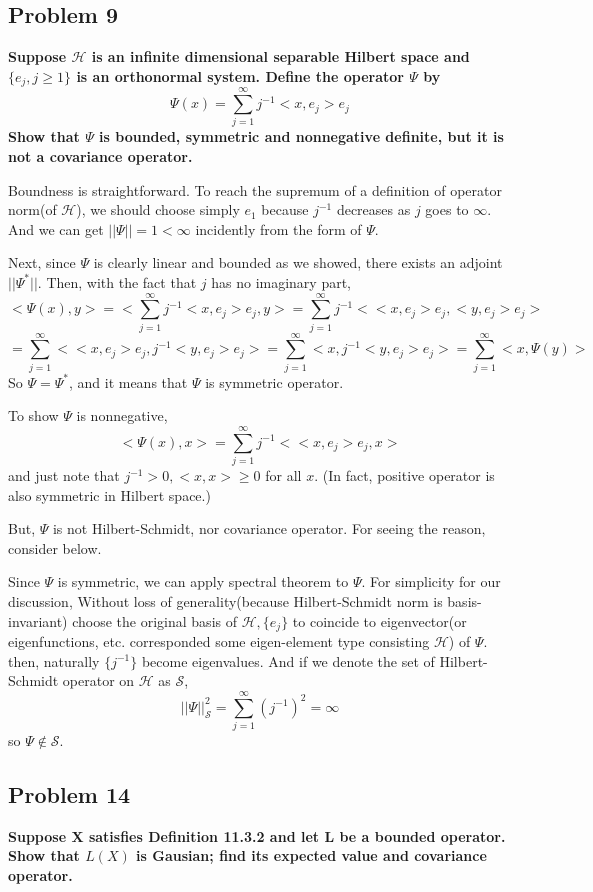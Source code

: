 \documentclass{article}
\begin{document}
\newpage
\subsection{Problem 9}
\textbf{
    Suppose $\mathcal{H}$ is an infinite dimensional separable Hilbert space and $\{e_j,j\geq1\}$ is an orthonormal system.
    Define the operator $\Psi$ by
    \[\Psi(x)=\sum_{j=1}^{\infty}j^{-1}<x,e_j>e_j\]
    Show that $\Psi$ is bounded, symmetric and nonnegative definite, but it is not a covariance operator.
}

Boundness is straightforward. To reach the supremum of a definition of operator norm(of $\mathcal{H}$),
we should choose simply $e_1$ because $j^{-1}$ decreases as $j$ goes to $\infty$.
And we can get $||\Psi||=1<\infty$ incidently from the form of $\Psi$.

Next, since $\Psi$ is clearly linear and bounded as we showed, there exists an adjoint $||\Psi^*||$.
Then, with the fact that $j$ has no imaginary part,
\[<\Psi(x),y>=<\sum_{j=1}^{\infty}j^{-1}<x,e_j>e_j,y>
=\sum_{j=1}^{\infty}j^{-1}<<x,e_j>e_j,<y,e_j>e_j>\]
\[=\sum_{j=1}^{\infty}<<x,e_j>e_j,j^{-1}<y,e_j>e_j>
=\sum_{j=1}^{\infty}<x,j^{-1}<y,e_j>e_j>
=\sum_{j=1}^{\infty}<x,\Psi(y)>\]
So $\Psi=\Psi^*$, and it means that $\Psi$ is symmetric operator.

To show $\Psi$ is nonnegative,
\[<\Psi(x),x>=\sum_{j=1}^{\infty}j^{-1}<<x,e_j>e_j,x>\]
and just note that $j^{-1}>0, <x,x>\geq0$ for all $x$. (In fact, positive operator is also symmetric in Hilbert space.)

But, $\Psi$ is not Hilbert-Schmidt, nor covariance operator. For seeing the reason, consider below.

Since $\Psi$ is symmetric, we can apply spectral theorem to $\Psi$.
For simplicity for our discussion, Without loss of generality(because Hilbert-Schmidt norm is basis-invariant) 
choose the original basis of $\mathcal{H}, \{e_j\}$ to coincide to eigenvector(or eigenfunctions, etc. corresponded some eigen-element type consisting $\mathcal{H}$) of $\Psi$.
then, naturally $\{j^{-1}\}$ become eigenvalues. And if we denote the set of Hilbert-Schmidt operator on $\mathcal{H}$ as $\mathcal{S}$,
\[||\Psi||_{\mathcal{S}}^{2}=\sum_{j=1}^{\infty}(j^{-1})^2=\infty\]
so $\Psi\notin\mathcal{S}$.



\subsection{Problem 14}
\textbf{
    Suppose X satisfies Definition 11.3.2 and let L be a bounded operator. 
    Show that $L(X)$ is Gausian; find its expected value and covariance operator.
}
\end{document}
